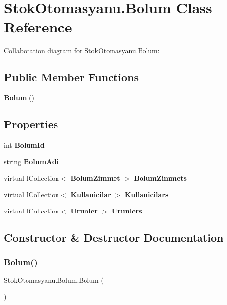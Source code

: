 \section{Stok\+Otomasyanu.\+Bolum Class Reference}
\label{class_stok_otomasyanu_1_1_bolum}


Collaboration diagram for Stok\+Otomasyanu.\+Bolum\+:
\subsection*{Public Member Functions}
\begin{DoxyCompactItemize}
\item 
\textbf{ Bolum} ()
\end{DoxyCompactItemize}
\subsection*{Properties}
\begin{DoxyCompactItemize}
\item 
int \textbf{ Bolum\+Id}\hspace{0.3cm}{\ttfamily  [get, set]}
\item 
string \textbf{ Bolum\+Adi}\hspace{0.3cm}{\ttfamily  [get, set]}
\item 
virtual I\+Collection$<$ \textbf{ Bolum\+Zimmet} $>$ \textbf{ Bolum\+Zimmets}\hspace{0.3cm}{\ttfamily  [get, set]}
\item 
virtual I\+Collection$<$ \textbf{ Kullanicilar} $>$ \textbf{ Kullanicilars}\hspace{0.3cm}{\ttfamily  [get, set]}
\item 
virtual I\+Collection$<$ \textbf{ Urunler} $>$ \textbf{ Urunlers}\hspace{0.3cm}{\ttfamily  [get, set]}
\end{DoxyCompactItemize}


\subsection{Constructor \& Destructor Documentation}
\mbox{\label{class_stok_otomasyanu_1_1_bolum_aba4b2e9d3c4741415566855eba1c395d}} 
\subsubsection{Bolum()}
{\footnotesize\ttfamily Stok\+Otomasyanu.\+Bolum.\+Bolum (\begin{DoxyParamCaption}{ }\end{DoxyParamCaption})}



